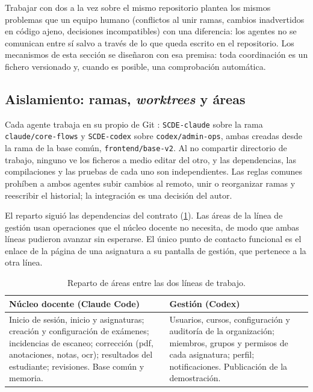 Trabajar con dos  a la vez sobre el mismo repositorio plantea los mismos
problemas que un equipo humano (conflictos al unir ramas, cambios inadvertidos en código
ajeno, decisiones incompatibles) con una diferencia: los agentes no se comunican entre sí
salvo a través de lo que queda escrito en el repositorio. Los mecanismos de esta sección se
diseñaron con esa premisa: toda coordinación es un fichero versionado y, cuando es posible,
una comprobación automática.

\subsection{Aislamiento: ramas, \textit{worktrees} y áreas}

Cada agente trabaja en su propio  de Git \cite{git_worktree}:
\texttt{SCDE-claude} sobre la rama \texttt{claude/core-flows} y \texttt{SCDE-codex} sobre
\texttt{codex/admin-ops}, ambas creadas desde la rama de la base común,
\texttt{frontend/base-v2}. Al no compartir directorio de trabajo, ninguno ve los ficheros a
medio editar del otro, y las dependencias, las compilaciones y las pruebas de cada uno son
independientes. Las reglas comunes prohíben a ambos agentes subir cambios al remoto, unir o
reorganizar ramas y reescribir el historial; la integración es una decisión del autor.

El reparto siguió las dependencias del contrato (\cref{TAB:IMP-SPLIT}). Las áreas de la
línea de gestión usan operaciones que el núcleo docente no necesita, de modo que ambas
líneas pudieron avanzar sin esperarse. El único punto de contacto funcional es el enlace de
la página de una asignatura a su pantalla de gestión, que pertenece a la otra línea.

\begin{table}[htbp]
  \centering
  \small
  \begin{tabular}{p{}p{}}
    \toprule
    \textbf{Núcleo docente (Claude Code)} & \textbf{Gestión (Codex)} \\
    \midrule
    Inicio de sesión, inicio y asignaturas; creación y configuración de exámenes;
    incidencias de escaneo; corrección (\acs{pdf}, anotaciones, notas, \acs{ocr});
    resultados del estudiante; revisiones. Base común y memoria. &
    Usuarios, cursos, configuración y auditoría de la organización; miembros, grupos y
    permisos de cada asignatura; perfil; notificaciones. Publicación de la demostración. \\
    \bottomrule
  \end{tabular}
  \caption{Reparto de áreas entre las dos líneas de trabajo.\label{TAB:IMP-SPLIT}}
\end{table}

